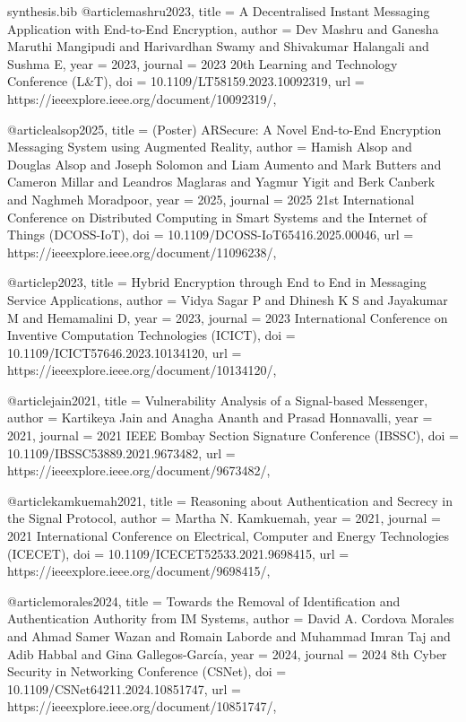 \begin{filecontents*}{synthesis.bib}
@article{mashru2023,
  title = {A Decentralised Instant Messaging Application with End-to-End Encryption},
  author = {Dev Mashru and Ganesha Maruthi Mangipudi and Harivardhan Swamy and Shivakumar Halangali and Sushma E},
  year = {2023},
  journal = {2023 20th Learning and Technology Conference (L\&T)},
  doi = {10.1109/LT58159.2023.10092319},
  url = {https://ieeexplore.ieee.org/document/10092319/},
}

@article{alsop2025,
  title = {(Poster) ARSecure: A Novel End-to-End Encryption Messaging System using Augmented Reality},
  author = {Hamish Alsop and Douglas Alsop and Joseph Solomon and Liam Aumento and Mark Butters and Cameron Millar and Leandros Maglaras and Yagmur Yigit and Berk Canberk and Naghmeh Moradpoor},
  year = {2025},
  journal = {2025 21st International Conference on Distributed Computing in Smart Systems and the Internet of Things (DCOSS-IoT)},
  doi = {10.1109/DCOSS-IoT65416.2025.00046},
  url = {https://ieeexplore.ieee.org/document/11096238/},
}

@article{p2023,
  title = {Hybrid Encryption through End to End in Messaging Service Applications},
  author = {Vidya Sagar P and Dhinesh K S and Jayakumar M and Hemamalini D},
  year = {2023},
  journal = {2023 International Conference on Inventive Computation Technologies (ICICT)},
  doi = {10.1109/ICICT57646.2023.10134120},
  url = {https://ieeexplore.ieee.org/document/10134120/},
}

@article{jain2021,
  title = {Vulnerability Analysis of a Signal-based Messenger},
  author = {Kartikeya Jain and Anagha Ananth and Prasad Honnavalli},
  year = {2021},
  journal = {2021 IEEE Bombay Section Signature Conference (IBSSC)},
  doi = {10.1109/IBSSC53889.2021.9673482},
  url = {https://ieeexplore.ieee.org/document/9673482/},
}

@article{kamkuemah2021,
  title = {Reasoning about Authentication and Secrecy in the Signal Protocol},
  author = {Martha N. Kamkuemah},
  year = {2021},
  journal = {2021 International Conference on Electrical, Computer and Energy Technologies (ICECET)},
  doi = {10.1109/ICECET52533.2021.9698415},
  url = {https://ieeexplore.ieee.org/document/9698415/},
}

@article{morales2024,
  title = {Towards the Removal of Identification and Authentication Authority from IM Systems},
  author = {David A. Cordova Morales and Ahmad Samer Wazan and Romain Laborde and Muhammad Imran Taj and Adib Habbal and Gina Gallegos-García},
  year = {2024},
  journal = {2024 8th Cyber Security in Networking Conference (CSNet)},
  doi = {10.1109/CSNet64211.2024.10851747},
  url = {https://ieeexplore.ieee.org/document/10851747/},
}


\end{filecontents*}
